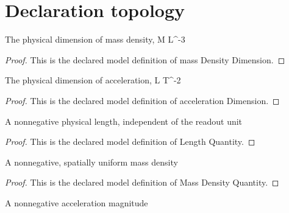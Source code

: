 \section{Declaration topology}
\begin{definition}
  \label{def:physics:phyx-mini-0393:phyxminiproblems-problemphyxmini0393-massdensitydimension}
  The physical dimension of mass density, M L\textasciicircum{}-3
\end{definition}
\begin{proof}
  This is the declared model definition of mass Density Dimension.
\end{proof}
\begin{definition}
  \label{def:physics:phyx-mini-0393:phyxminiproblems-problemphyxmini0393-accelerationdimension}
  The physical dimension of acceleration, L T\textasciicircum{}-2
\end{definition}
\begin{proof}
  This is the declared model definition of acceleration Dimension.
\end{proof}
\begin{definition}
  \label{def:physics:phyx-mini-0393:phyxminiproblems-problemphyxmini0393-lengthquantity}
  A nonnegative physical length, independent of the readout unit
\end{definition}
\begin{proof}
  This is the declared model definition of Length Quantity.
\end{proof}
\begin{definition}
  \label{def:physics:phyx-mini-0393:phyxminiproblems-problemphyxmini0393-massdensityquantity}
  A nonnegative, spatially uniform mass density
\end{definition}
\begin{proof}
  This is the declared model definition of Mass Density Quantity.
\end{proof}
\begin{definition}
  \label{def:physics:phyx-mini-0393:phyxminiproblems-problemphyxmini0393-accelerationquantity}
  A nonnegative acceleration magnitude
\end{definition}
